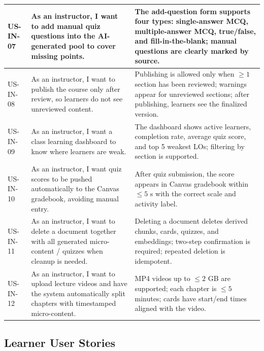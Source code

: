 \begin{longtable}{|p{1.6cm}|p{5.6cm}|p{7cm}|}
\hline
US-IN-07 & As an instructor, I want to add manual quiz questions into the AI-generated pool to cover missing points. & The add-question form supports four types: single-answer MCQ, multiple-answer MCQ, true/false, and fill-in-the-blank; manual questions are clearly marked by source. \\
\hline
US-IN-08 & As an instructor, I want to publish the course only after review, so learners do not see unreviewed content. & Publishing is allowed only when \(\geq 1\) section has been reviewed; warnings appear for unreviewed sections; after publishing, learners see the finalized version. \\
\hline
US-IN-09 & As an instructor, I want a class learning dashboard to know where learners are weak. & The dashboard shows active learners, completion rate, average quiz score, and top 5 weakest LOs; filtering by section is supported. \\
\hline
US-IN-10 & As an instructor, I want quiz scores to be pushed automatically to the Canvas gradebook, avoiding manual entry. & After quiz submission, the score appears in Canvas gradebook within \(\leq 5\) s with the correct scale and activity label. \\
\hline
US-IN-11 & As an instructor, I want to delete a document together with all generated micro-content / quizzes when cleanup is needed. & Deleting a document deletes derived chunks, cards, quizzes, and embeddings; two-step confirmation is required; repeated deletion is idempotent. \\
\hline
US-IN-12 & As an instructor, I want to upload lecture videos and have the system automatically split chapters with timestamped micro-content. & MP4 videos up to \(\leq 2\) GB are supported; each chapter is \(\leq 5\) minutes; cards have start/end times aligned with the video. \\
\hline
\end{longtable}
\endgroup

\subsection{Learner User Stories}

